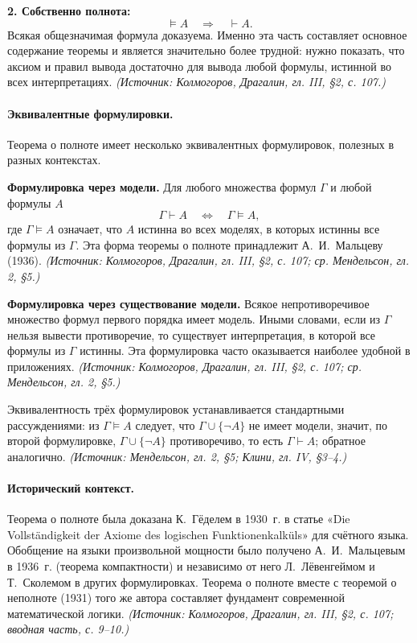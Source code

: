 \documentclass[a4paper,12pt]{article}
\begin{document}
\textbf{2. Собственно полнота:}
\[
\models A \quad\Longrightarrow\quad \vdash A.
\]
Всякая общезначимая формула доказуема. Именно эта часть составляет основное содержание теоремы и является значительно более трудной: нужно показать, что аксиом и правил вывода достаточно для вывода любой формулы, истинной во всех интерпретациях.
\textit{(Источник: Колмогоров, Драгалин, гл. III, §2, с. 107.)}

\paragraph{Эквивалентные формулировки.} Теорема о полноте имеет несколько эквивалентных формулировок, полезных в разных контекстах.

\textbf{Формулировка через модели.} Для любого множества формул \(\Gamma\) и любой формулы \(A\)
\[
\Gamma\vdash A \quad\Longleftrightarrow\quad \Gamma\models A,
\]
где \(\Gamma\models A\) означает, что \(A\) истинна во всех моделях, в которых истинны все формулы из \(\Gamma\). Эта форма теоремы о полноте принадлежит А.~И.~Мальцеву (1936).
\textit{(Источник: Колмогоров, Драгалин, гл. III, §2, с. 107; ср. Мендельсон, гл. 2, §5.)}

\textbf{Формулировка через существование модели.} Всякое непротиворечивое множество формул первого порядка имеет модель. Иными словами, если из \(\Gamma\) нельзя вывести противоречие, то существует интерпретация, в которой все формулы из \(\Gamma\) истинны. Эта формулировка часто оказывается наиболее удобной в приложениях.
\textit{(Источник: Колмогоров, Драгалин, гл. III, §2, с. 107; ср. Мендельсон, гл. 2, §5.)}

Эквивалентность трёх формулировок устанавливается стандартными рассуждениями: из \(\Gamma\models A\) следует, что \(\Gamma\cup\{\neg A\}\) не имеет модели, значит, по второй формулировке, \(\Gamma\cup\{\neg A\}\) противоречиво, то есть \(\Gamma\vdash A\); обратное аналогично.
\textit{(Источник: Мендельсон, гл. 2, §5; Клини, гл. IV, §3--4.)}

\paragraph{Исторический контекст.} Теорема о полноте была доказана К.~Гёделем в 1930~г. в статье «Die Vollständigkeit der Axiome des logischen Funktionenkalküls» для счётного языка. Обобщение на языки произвольной мощности было получено А.~И.~Мальцевым в 1936~г. (теорема компактности) и независимо от него Л.~Лёвенгеймом и Т.~Сколемом в других формулировках. Теорема о полноте вместе с теоремой о неполноте (1931) того же автора составляет фундамент современной математической логики.
\textit{(Источник: Колмогоров, Драгалин, гл. III, §2, с. 107; вводная часть, с. 9--10.)}
\end{document}
